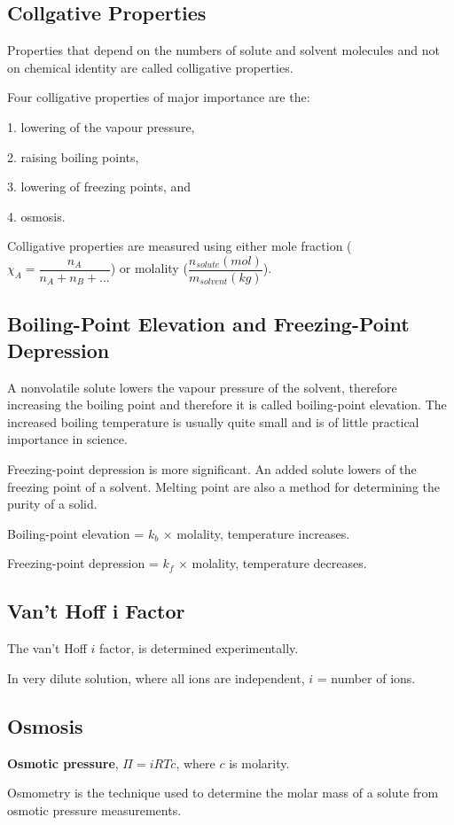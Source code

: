 \documentclass[a4paper,12pt]{article}
\begin{document}
\subsection{Collgative Properties}
Properties that depend on the numbers of solute and solvent molecules and not on chemical identity are called colligative properties.\par
Four colligative properties of major importance are the:\par
1. lowering of the vapour pressure,\par
2. raising boiling points,\par
3. lowering of freezing points, and\par
4. osmosis.\par
Colligative properties are measured using either mole fraction ($\chi_{A}=\dfrac{n_{A}}{n_{A}+n_{B}+...}$) or molality ($\dfrac{n_{solute}(mol)}{m_{solvent}(kg)}$).
\subsection{Boiling-Point Elevation and Freezing-Point Depression}
A nonvolatile solute lowers the vapour pressure of the solvent, therefore increasing the boiling point and therefore it is called boiling-point elevation. The increased boiling temperature is usually quite small and is of little practical importance in science.\par
Freezing-point depression is more significant. An added solute lowers of the freezing point of a solvent. Melting point are also a method for determining the purity of a solid.\par
Boiling-point elevation = $k_{b}$ × molality, temperature increases.\par
Freezing-point depression = $k_{f}$ × molality, temperature decreases.
\subsection{Van't Hoff i Factor}
The van't Hoff $i$ factor, is determined experimentally.\par
In very dilute solution, where all ions are independent, $i$ = number of ions.
\subsection{Osmosis}
\textbf{Osmotic pressure}, $\Pi = iRTc$, where $c$ is molarity.\par
Osmometry is the technique used to determine the molar mass of a solute from osmotic pressure measurements.



\newpage
\end{document}

